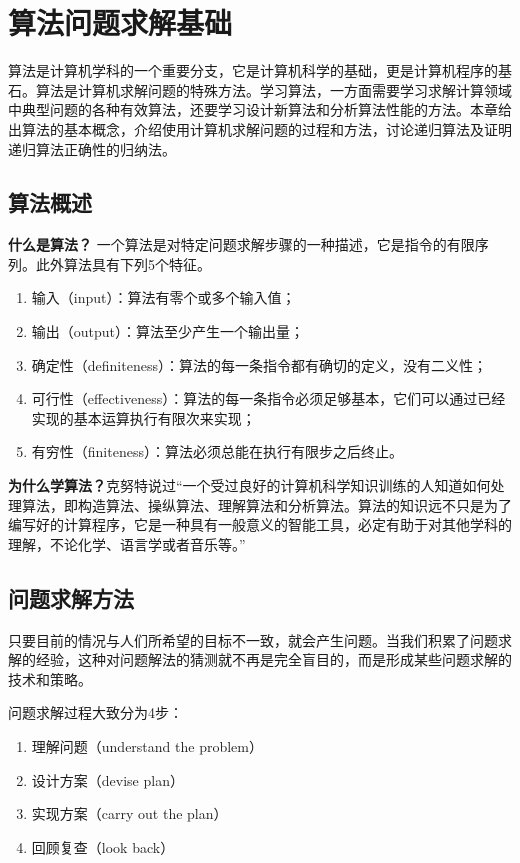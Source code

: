 \section{算法问题求解基础}

算法是计算机学科的一个重要分支，它是计算机科学的基础，更是计算机程序的基石。算法是计算机求解问题的特殊方法。学习算法，一方面需要学习求解计算领域中典型问题的各种有效算法，还要学习设计新算法和分析算法性能的方法。本章给出算法的基本概念，介绍使用计算机求解问题的过程和方法，讨论递归算法及证明递归算法正确性的归纳法。

\subsection*{算法概述}
\textbf{什么是算法？}
一个算法是对特定问题求解步骤的一种描述，它是指令的有限序列。此外算法具有下列5个特征。
\begin{enumerate}
	\item 输入（input）：算法有零个或多个输入值；
	\item 输出（output）：算法至少产生一个输出量；
	\item 确定性（definiteness）：算法的每一条指令都有确切的定义，没有二义性；
	\item 可行性（effectiveness）：算法的每一条指令必须足够基本，它们可以通过已经实现的基本运算执行有限次来实现；
	\item 有穷性（finiteness）：算法必须总能在执行有限步之后终止。
\end{enumerate}

\textbf{为什么学算法？}克努特说过“一个受过良好的计算机科学知识训练的人知道如何处理算法，即构造算法、操纵算法、理解算法和分析算法。算法的知识远不只是为了编写好的计算程序，它是一种具有一般意义的智能工具，必定有助于对其他学科的理解，不论化学、语言学或者音乐等。”
\subsection*{问题求解方法}
只要目前的情况与人们所希望的目标不一致，就会产生问题。当我们积累了问题求解的经验，这种对问题解法的猜测就不再是完全盲目的，而是形成某些问题求解的技术和策略。

问题求解过程大致分为4步：
\begin{enumerate}
	\item 理解问题（understand the problem）
	\item 设计方案（devise plan）
	\item 实现方案（carry out the plan）
	\item 回顾复查（look back）
\end{enumerate}
